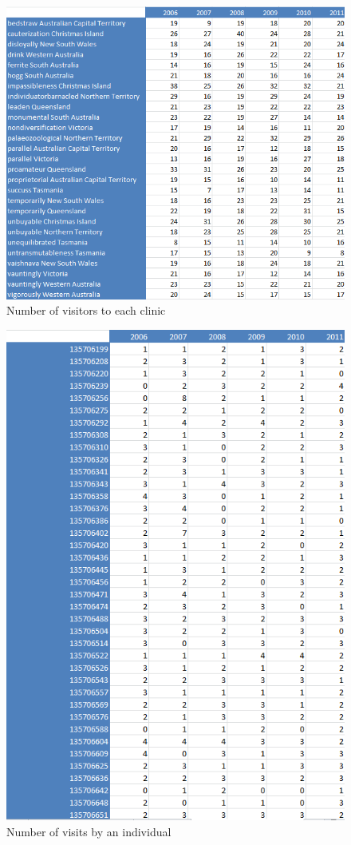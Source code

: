 \documentclass[a4paper,12pt,openany]{report}
\begin{document}
\begin{figure}[ht!]
	\centering
	\includegraphics[width=15cm]{visitsperclinic}
	\caption{Number of visitors to each clinic}
	\label{fig:{visitsperclinic}}
\end{figure}

\begin{figure}[ht!]
	\centering
	\includegraphics[width=15cm]{visitsperperson}
	\caption{Number of visits by an individual}
	\label{fig:visitsperperson}
\end{figure}
\end{document}
